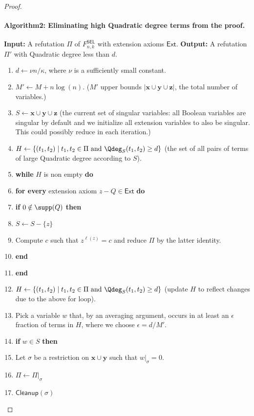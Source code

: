 \begin{proof}
\paragraph{Algorithm2: Eliminating high Quadratic degree terms from the proof.}
\textbf{Input:} A refutation $\Pi$ of $F^{\mathsf{SEL}}_{n,k}$ with extension axioms $\mathsf{Ext}$.
\textbf{Output:} A refutation $\Pi'$ with Quadratic degree less than $d$.
\begin{enumerate}[label=\arabic*,leftmargin=*]
\item $d\leftarrow\nu n/\kappa$, where $\nu$ is a sufficiently small constant.
\item $M'\leftarrow M+n\log(n)$. ($M'$ upper bounds $|\mathbf x\cup\mathbf y\cup\mathbf z|$, the total number of variables.)
\item $S\leftarrow\mathbf x\cup\mathbf y\cup\mathbf z$ (the current set of singular variables: all Boolean variables are singular by default and we initialize all extension variables to also be singular. This could possibly reduce in each iteration.)
\item $H\leftarrow\{(t_1,t_2)\mid t_1,t_2\in\Pi\text{ and }\Qdeg_S(t_1,t_2)\geq d\}$ (the set of all pairs of terms of large Quadratic degree according to $S$).
\item \textbf{while} $H$ is non empty \textbf{do}
\item \textbf{for every} extension axiom $z-Q\in\mathsf{Ext}$ \textbf{do}
\item \textbf{if} $0\notin\supp(Q)$ \textbf{then}
\item $S\leftarrow S-\{z\}$
\item Compute $c$ such that $z^{\ell(z)}=c$ and reduce $\Pi$ by the latter identity.
\item \textbf{end}
\item \textbf{end}
\item $H\leftarrow\{(t_1,t_2)\mid t_1,t_2\in\Pi\text{ and }\Qdeg_S(t_1,t_2)\geq d\}$ (update $H$ to reflect changes due to the above for loop).
\item Pick a variable $w$ that, by an averaging argument, occurs in at least an $\epsilon$ fraction of terms in $H$, where we choose $\epsilon=d/M'$.
\item \textbf{if} $w\in S$ \textbf{then}
\item Let $\sigma$ be a restriction on $\mathbf x\cup\mathbf y$ such that $w|_{\sigma}=0$.
\item $\Pi\leftarrow\Pi|_{\sigma}$
\item $\mathsf{Cleanup}(\sigma)$

\end{enumerate}
\end{proof}
